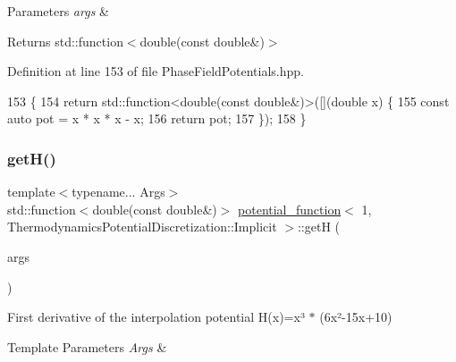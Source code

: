 \begin{DoxyParams}{Parameters}
{\em args} & \\
\hline
\end{DoxyParams}
\begin{DoxyReturn}{Returns}
std\+::function$<$double(const double\&)$>$ 
\end{DoxyReturn}


Definition at line 153 of file Phase\+Field\+Potentials.\+hpp.


\begin{DoxyCode}
153                                                         \{
154     \textcolor{keywordflow}{return} std::function<double(const double&)>([](\textcolor{keywordtype}{double} x) \{
155       \textcolor{keyword}{const} \textcolor{keyword}{auto} pot = x * x * x - x;
156       \textcolor{keywordflow}{return} pot;
157     \});
158   \}
\end{DoxyCode}
\mbox{\label{structpotential__function_3_011_00_01ThermodynamicsPotentialDiscretization_1_1Implicit_01_4_a6a52cc510f4213371c7e99e4b6fbe477}} 
\subsubsection{\texorpdfstring{get\+H()}{getH()}}
{\footnotesize\ttfamily template$<$typename... Args$>$ \\
std\+::function$<$double(const double\&)$>$ \hyperlink{structpotential__function}{potential\+\_\+function}$<$ 1, Thermodynamics\+Potential\+Discretization\+::\+Implicit $>$\+::getH (\begin{DoxyParamCaption}\item[{Args...}]{args }\end{DoxyParamCaption})\hspace{0.3cm}{\ttfamily [inline]}}



First derivative of the interpolation potential H(x)=x³ $\ast$ (6x²-\/15x+10) 


\begin{DoxyTemplParams}{Template Parameters}
{\em Args} & \\
\hline
\end{DoxyTemplParams}

